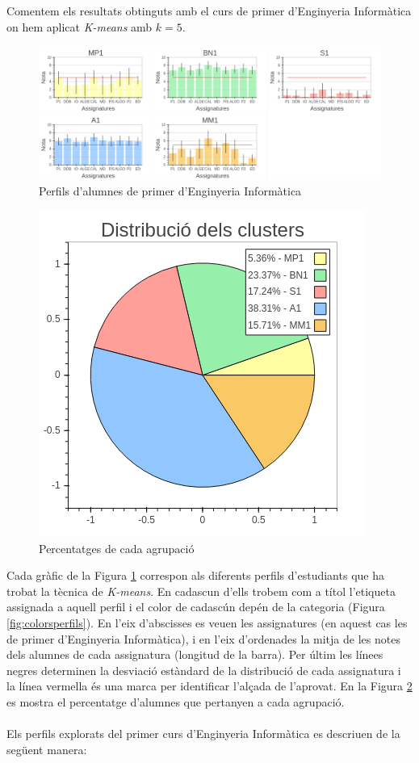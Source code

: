 \documentclass[12pt,a4paper,catalan]{article}
\begin{document}
\newpage

Comentem els resultats obtinguts amb el curs de primer d'Enginyeria Informàtica on hem aplicat \textit{K-means} amb $k=5$.

\begin{figure}[h]
\centering
\includegraphics[width=\linewidth]{img/perfils_primer_info.png}
\caption{Perfils d'alumnes de primer d'Enginyeria Informàtica}
\label{fig:perfilsprimerinfo}
\end{figure}

\begin{figure}[h]
\centering
\includegraphics[width=.55\linewidth]{img/perfils_primer_info_pastilla.png}
\caption{Percentatges de cada agrupació}
\label{fig:pasprimerinfo}
\end{figure}

Cada gràfic de la Figura \ref{fig:perfilsprimerinfo} correspon als diferents perfils d'estudiants que ha trobat la tècnica de \textit{K-means}. En cadascun d'ells trobem com a títol l'etiqueta assignada a aquell perfil i el color de cadascún depén de la categoria (Figura \ref{fig:colorsperfils}). En l'eix d'abscisses es veuen les assignatures (en aquest cas les de primer d'Enginyeria Informàtica), i en l'eix d'ordenades la mitja de les notes dels alumnes de cada assignatura (longitud de la barra). Per últim les línees negres determinen la desviació estàndard de la distribució de cada assignatura i la línea vermella és una marca per identificar l'alçada de l'aprovat. En la Figura \ref{fig:pasprimerinfo} es mostra el percentatge d'alumnes que pertanyen a cada agrupació.
\\
\\
Els perfils explorats del primer curs d'Enginyeria Informàtica es descriuen de la següent manera:
\end{document}

